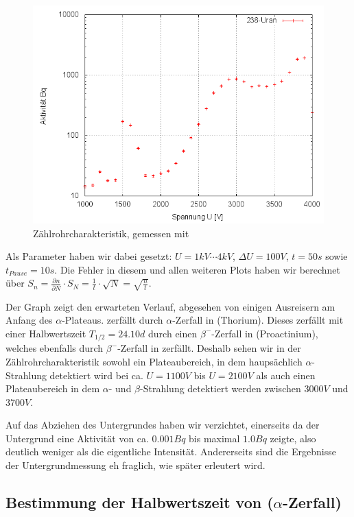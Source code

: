 \begin{figure}[H]
 \centering \includegraphics[width=0.9\linewidth]{Messwerte/plots/U238.png}
 \caption{Zählrohrcharakteristik, gemessen mit }
\end{figure}
Als Parameter haben wir dabei gesetzt: $U = 1kV \cdots 4kV$, $\Delta U = 100 V$, $t = 50s$ sowie $t_{Pause} = 10s$. Die Fehler in diesem und allen weiteren Plots haben wir berechnet über $ S_n = \frac{\partial n}{\partial N} \cdot S_N = \frac{1}{t} \cdot \sqrt{N} = \sqrt{\frac{n}{t}}$.

Der Graph zeigt den erwarteten Verlauf, abgesehen von einigen Ausreisern am Anfang des $\alpha$-Plateaus.  zerfällt durch $\alpha$-Zerfall in  (Thorium). Dieses zerfällt mit einer Halbwertszeit $T_{1/2} = 24.10d$ durch einen $\beta^-$-Zerfall in  (Proactinium), welches ebenfalls durch $\beta^-$-Zerfall in  zerfällt. Deshalb sehen wir in der Zählrohrcharakteristik sowohl ein Plateaubereich, in dem haupsächlich $\alpha$-Strahlung detektiert wird bei ca. $U = 1100V$ bis $U = 2100V$ als auch einen Plateaubereich in dem $\alpha$- und $\beta$-Strahlung detektiert werden zwischen $3000V$ und $3700V$.

Auf das Abziehen des Untergrundes haben wir verzichtet, einerseits da der Untergrund eine Aktivität von ca. $0.001Bq$ bis maximal $1.0Bq$ zeigte, also deutlich weniger als die eigentliche Intensität. Andererseits sind die Ergebnisse der Untergrundmessung eh fraglich, wie später erleutert wird.

\subsection{Bestimmung der Halbwertszeit von  ($\alpha$-Zerfall)}

